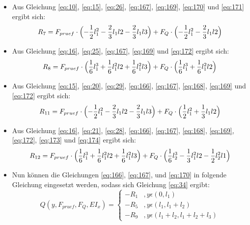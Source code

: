 \begin{itemize}
\begin{equation}
	\end{equation}
	\item Aus Gleichung \ref{eq:10}, \ref{eq:15}, \ref{eq:26}, \ref{eq:167}, \ref{eq:169}, \ref{eq:170} und \ref{eq:171} ergibt sich:
	\begin{equation}\label{eq:172}
		R_{7}=F_{pruef}\cdot \Bigl(-\frac{1}{2} l_{1}^{2}-\frac{2}{3} l_{1}l{2}-\frac{2}{3} l_{1}l{3}\Bigr) + F_{Q}\cdot \Bigl(-\frac{1}{2} l_{1}^{2}-\frac{2}{3} l_{1}l{2}\Bigr)
	\end{equation}
	\item Aus Gleichung \ref{eq:16}, \ref{eq:25}, \ref{eq:167}, \ref{eq:169} und \ref{eq:172} ergibt sich:
	\begin{equation}\label{eq:173}
		R_{8}=F_{pruef}\cdot \Bigl(\frac{1}{6} l_{1}^{3}+\frac{1}{6} l_{1}^{2}l{2}+\frac{1}{6} l_{1}^{2}l{3}\Bigr) + F_{Q}\cdot \Bigl(\frac{1}{6} l_{1}^{3}+\frac{1}{6} l_{1}^{2}l{2}\Bigr)
	\end{equation}
	\item Aus Gleichung \ref{eq:15}, \ref{eq:20}, \ref{eq:29}, \ref{eq:166}, \ref{eq:167}, \ref{eq:168}, \ref{eq:169} und \ref{eq:172} ergibt sich:
	\begin{equation}\label{eq:174}
		R_{11}=F_{pruef}\cdot \Bigl(-\frac{1}{2} l_{1}^{2}-\frac{2}{3} l_{1}l{2}-\frac{2}{3} l_{1}l{3}\Bigr) + F_{Q}\cdot \Bigl(\frac{1}{2} l_{1}^{2}+\frac{1}{3} l_{1}l{2}\Bigr)
	\end{equation}
	\item Aus Gleichung \ref{eq:16}, \ref{eq:21}, \ref{eq:28}, \ref{eq:166}, \ref{eq:167}, \ref{eq:168}, \ref{eq:169}, \ref{eq:172}, \ref{eq:173} und \ref{eq:174} ergibt sich:
	\begin{equation}\label{eq:175}
		R_{12}=F_{pruef}\cdot \Bigl(\frac{1}{6} l_{1}^{3}+\frac{1}{6} l_{1}^{2}l{2}+\frac{1}{6} l_{1}^{2}l{3}\Bigr) + F_{Q}\cdot \Bigl(\frac{1}{6} l_{2}^{3}-\frac{1}{3} l_{1}^{2}l{2}-\frac{1}{2} l_{2}^{2}l{1}\Bigr)
	\end{equation}
	\item Nun können die Gleichungen \ref{eq:166}, \ref{eq:167}, und \ref{eq:170} in folgende Gleichung eingesetzt werden, sodass sich Gleichung \ref{eq:34} ergibt:
	\begin{equation}
		Q(y,F_{pruef},F_{Q},EI_{x})=\left\{\begin{array}{ll}
			-R_{1}&,y\epsilon (0,l_{1})\\
			-R_{5}&,y\epsilon (l_{1}, l_{1}+l_{2})\\
			-R_{9}&,y\epsilon (l_{1}+l_{2}, l_{1}+l_{2}+l_{3})
		\end{array}\right.

\end{equation}
\end{itemize}
